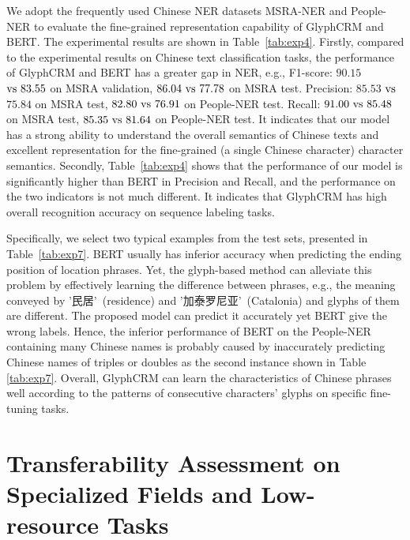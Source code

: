 We adopt the frequently used Chinese NER datasets MSRA-NER and People-NER to evaluate the fine-grained representation capability of GlyphCRM and BERT. The experimental results are shown in Table~\ref{tab:exp4}. Firstly, compared to the experimental results on Chinese text classification tasks, the performance of GlyphCRM and BERT has a greater gap in NER, e.g., F1-score: $90.15$ $\rm{vs}~83.55$ on MSRA validation, $86.04~\rm{vs}~77.78$ on MSRA test. Precision: $85.53$ $\rm{vs}$~$75.84$ on MSRA test, $82.80~\rm{vs}~76.91$ on People-NER test. Recall: $91.00~\rm{vs}~85.48$ on MSRA test, $85.35~\rm{vs}~81.64$ on People-NER test. It indicates that our model has a strong ability to understand the overall semantics of Chinese texts and excellent representation for the fine-grained (a single Chinese character) character semantics. Secondly, Table~\ref{tab:exp4} shows that the performance of our model is significantly higher than BERT in Precision and Recall, and the performance on the two indicators is not much different. It indicates that GlyphCRM has high overall recognition accuracy on sequence labeling tasks.

\begin{CJK}{UTF8}{gbsn}
Specifically, we select two typical examples from the test sets, presented in Table~\ref{tab:exp7}. 
BERT usually has inferior accuracy when predicting the ending position of location phrases. Yet, the glyph-based method can alleviate this problem by effectively learning the difference between phrases, e.g., the meaning conveyed by '民居'~(residence) and '加泰罗尼亚'~(Catalonia) and glyphs of them are different. The proposed model can predict it accurately yet BERT
give the wrong labels. 
Hence, the inferior performance of BERT on the People-NER containing many Chinese names is probably caused by inaccurately predicting Chinese names of triples or doubles as the second instance shown in Table \ref{tab:exp7}. Overall, GlyphCRM can learn the characteristics of Chinese phrases well according to the patterns of consecutive characters' glyphs on specific fine-tuning tasks.
\end{CJK}
\section{Transferability Assessment on Specialized Fields and Low-resource Tasks}

